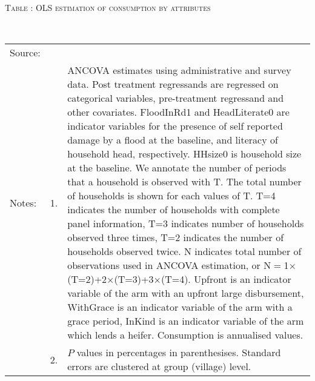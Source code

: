 \hspace{-1cm}\begin{minipage}[t]{14cm}
\hfil\textsc{\normalsize Table \thetable: OLS estimation of consumption by attributes \label{tab ANCOVA consumption attributes original HH}}\\
\setlength{\tabcolsep}{1pt}
\setlength{\baselineskip}{8pt}
\renewcommand{\arraystretch}{.55}
\hfil{}\\
\renewcommand{\arraystretch}{.8}
\setlength{\tabcolsep}{1pt}
\begin{tabular}{>{\hfill\scriptsize}p{1cm}<{}>{\hfill\scriptsize}p{.25cm}<{}>{\scriptsize}p{12cm}<{\hfill}}
Source:& \multicolumn{2}{l}{\scriptsize Estimated with GUK administrative and survey data.}\\
Notes: & 1. & ANCOVA estimates using administrative and survey data. Post treatment regressands are regressed on categorical variables, pre-treatment regressand and other covariates. \textsf{FloodInRd1} and \textsf{HeadLiterate0} are indicator variables for the presence of self reported damage by a flood at the baseline, and literacy of household head, respectively. \textsf{HHsize0} is household size at the baseline. We annotate the number of periods that a household is observed with \textsf{T}. The total number of households is shown for each values of \textsf{T}. \textsf{T=4} indicates the number of households with complete panel information, \textsf{T=3} indicates number of households observed three times, \textsf{T=2} indicates the number of households observed twice. \textsf{N} indicates total number of observations used in ANCOVA estimation, or \textsf{N$=$1$\times$(T=2)+2$\times$(T=3)+3$\times$(T=4)}.  \textsf{Upfront} is an indicator variable of the arm with an upfront large disbursement, \textsf{WithGrace} is an indicator variable of the arm with a grace period, \textsf{InKind} is an indicator variable of the arm which lends a heifer. Consumption is annualised values. \\
& 2. & $P$ values in percentages in parenthesises. Standard errors are clustered at group (village) level.
\end{tabular}
\end{minipage}



